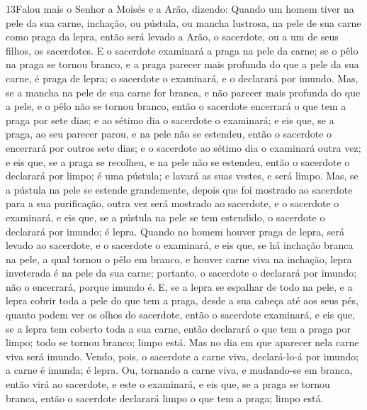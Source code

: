 \lettrine{13} Falou mais o Senhor a Moisés e a Arão, dizendo:
Quando um homem tiver na pele da sua carne, inchação, ou
pústula, ou mancha lustrosa, na pele de sua carne como praga da
lepra, então será levado a Arão, o sacerdote, ou a um de seus
filhos, os sacerdotes. E o sacerdote examinará a praga na pele
da carne; se o pêlo na praga se tornou branco, e a praga parecer
mais profunda do que a pele da sua carne, é praga de lepra; o
sacerdote o examinará, e o declarará por imundo. Mas, se a
mancha na pele de sua carne for branca, e não parecer mais profunda
do que a pele, e o pêlo não se tornou branco, então o sacerdote
encerrará o que tem a praga por sete dias; e ao sétimo dia o
sacerdote o examinará; e eis que, se a praga, ao seu parecer parou,
e na pele não se estendeu, então o sacerdote o encerrará por outros
sete dias; e o sacerdote ao sétimo dia o examinará outra vez; e
eis que, se a praga se recolheu, e na pele não se estendeu, então o
sacerdote o declarará por limpo; é uma pústula; e lavará as suas
vestes, e será limpo. Mas, se a pústula na pele se estende
grandemente, depois que foi mostrado ao sacerdote para a sua
purificação, outra vez será mostrado ao sacerdote, e o sacerdote
o examinará, e eis que, se a pústula na pele se tem estendido, o
sacerdote o declarará por imundo; é lepra. Quando no homem
houver praga de lepra, será levado ao sacerdote, e o
sacerdote o examinará, e eis que, se há inchação branca na pele, a
qual tornou o pêlo em branco, e houver carne viva na inchação,
lepra inveterada é na pele da sua carne; portanto, o
sacerdote o declarará por imundo; não o encerrará, porque imundo é.
E, se a lepra se espalhar de todo na pele, e a lepra cobrir
toda a pele do que tem a praga, desde a sua cabeça até aos seus pés,
quanto podem ver os olhos do sacerdote, então o sacerdote
examinará, e eis que, se a lepra tem coberto toda a sua carne, então
declarará o que tem a praga por limpo; todo se tornou branco; limpo
está. Mas no dia em que aparecer nela carne viva será imundo.
Vendo, pois, o sacerdote a carne viva, declará-lo-á por
imundo; a carne é imunda; é lepra. Ou, tornando a carne viva,
e mudando-se em branca, então virá ao sacerdote, e este o
examinará, e eis que, se a praga se tornou branca, então o sacerdote
declarará limpo o que tem a praga; limpo está.

